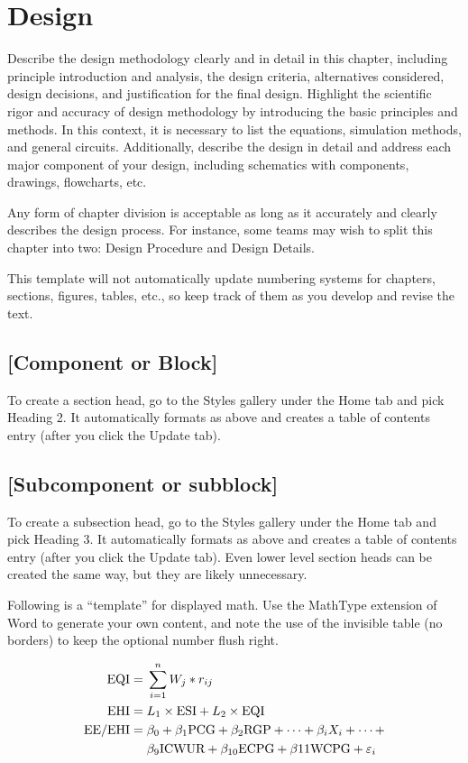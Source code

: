 \clearpage
\section{Design}

Describe the design methodology clearly and in detail in this chapter, including principle introduction and analysis, the design criteria, alternatives considered, design decisions, and justification for the final design. Highlight the scientific rigor and accuracy of design methodology by introducing the basic principles and methods. In this context, it is necessary to list the equations, simulation methods, and general circuits. Additionally, describe the design in detail and address each major component of your design, including schematics with components, drawings, flowcharts, etc.

Any form of chapter division is acceptable as long as it accurately and clearly describes the design process. For instance, some teams may wish to split this chapter into two: Design Procedure and Design Details.

This template will not automatically update numbering systems for chapters, sections, figures, tables, etc., so keep track of them as you develop and revise the text.

\subsection{[Component or Block]}

To create a section head, go to the Styles gallery under the Home tab and pick Heading 2. It automatically formats as above and creates a table of contents entry (after you click the Update tab).

\subsection{[Subcomponent or subblock]}

To create a subsection head, go to the Styles gallery under the Home tab and pick Heading 3. It automatically formats as above and creates a table of contents entry (after you click the Update tab). Even lower level section heads can be created the same way, but they are likely unnecessary.

Following is a “template” for displayed math. Use the MathType extension of Word to generate your own content, and note the use of the invisible table (no borders) to keep the optional number flush right.

\begin{align}
    \text{EQI} ={}& \sum_{i=1}^{n}{W_j\ast r_{ij}} \\
    \text{EHI} ={}& L_1 \times \text{ESI} + L_2\times \text{EQI} \\
    \text{EE}/\text{EHI} ={}& \beta_0+\beta_1\text{PCG}+\beta_2\text{RGP}+\cdots+\beta_i X_i+ \cdots + \notag\\
            & \beta_9\text{ICWUR}+\beta_{10}\text{ECPG}+\beta{11}\text{WCPG}+\varepsilon_i    
\end{align}
